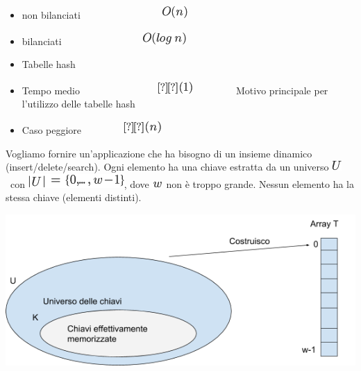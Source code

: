 \documentclass{article}
\providecommand{\tightlist}{%
  \setlength{\itemsep}{0pt}\setlength{\parskip}{0pt}}
\begin{document}
\begin{itemize}
\tightlist
\item
  {non bilanciati ~~~~~~~~~~~~~~~~}\includegraphics{images/image146.png}
\item
  {bilanciati ~~~~~~~~~~~~~~~~}\includegraphics{images/image220.png}
\end{itemize}

\begin{itemize}
\tightlist
\item
  {Tabelle hash}
\end{itemize}

\begin{itemize}
\tightlist
\item
  {Tempo
  medio~~~~~~~~~~~~~~~~}\includegraphics{images/image221.png}{~~~~~~~~~Motivo
  principale per l'utilizzo delle tabelle hash}
\item
  {Caso peggiore ~~~~~~~~}\includegraphics{images/image149.png}
\end{itemize}

{}

{Vogliamo fornire un'applicazione che ha bisogno di un insieme dinamico
(insert/delete/search). Ogni elemento ha una chiave estratta da un
universo }\includegraphics{images/image222.png}{~con
}\includegraphics{images/image223.png}{, dove
}\includegraphics{images/image224.png}{~non è troppo grande. Nessun
elemento ha la stessa chiave (elementi distinti). }

{}

{\includegraphics{images/image521.png}}
\end{document}
